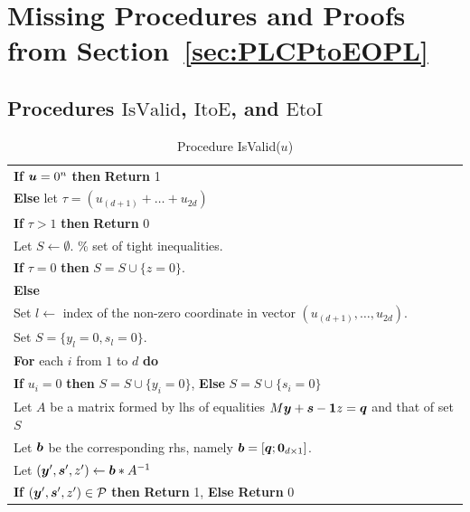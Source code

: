\documentclass[a4paper,UKenglish]{lipics2}
\theoremstyle{definition}
\def\ite{\mbox{ItoE}}
\def\eti{\mbox{EtoI}}
\def\isvalid{\mbox{IsValid}}
\newcommand{\CPol}{\mbox{${\mathcal P}$}}
\newcommand{\yy}{\mbox{\boldmath $y$}}
\newcommand{\bb}{\mbox{\boldmath $b$}}
\newcommand{\uu}{\mbox{\boldmath $u$}}
\newcommand{\qq}{\mbox{\boldmath $q$}}
\newcommand{\ones}{\mbox{\boldmath $1$}}
\newcommand{\zeros}{\mbox{\boldmath $0$}}
\newcommand{\ps}{\mbox{\boldmath $s$}}
\begin{document}
\newpage

\section{Missing Procedures and Proofs from Section~\ref{sec:PLCPtoEOPL}}\label{app:PLCPtoEOPL}
\subsection{Procedures $\isvalid$, $\ite$, and $\eti$}\label{app:proc}
\begin{table}[!hbt]
\caption{Procedure \isvalid(\uu)}\label{tab:iv}
\begin{tabular}{|l|}
\hline
\hspace{5pt} {\bf If} $\uu=0^{n}$ {\bf then} {\bf Return} 1\\
\hspace{5pt} {\bf Else} let $\tau = (u_{(d+1)}+\dots+u_{2d})$\\
\hspace{15pt} {\bf If} $\tau> 1$ {\bf then} {\bf Return} 0\\
\hspace{15pt} Let $S\leftarrow \emptyset$. \% set of tight inequalities. \\
\hspace{15pt} {\bf If} $\tau = 0$ {\bf then} $S=S\cup \{ z=0\}$. \\
\hspace{15pt} {\bf Else}\\
\hspace{30pt} Set $l\leftarrow $ index of the non-zero coordinate in vector $(u_{(d+1)},\dots,u_{2d})$. \\
\hspace{30pt} Set $S=\{y_l=0, s_l=0\}$.\\
\hspace{15pt} {\bf For} each $i$ from $1$ to $d$ {\bf do} \\
\hspace{30pt} {\bf If} $u_i=0$ {\bf then} $S=S\cup \{y_i=0\}$, {\bf Else} $S=S\cup \{s_i=0\}$\\
\hspace{15pt} Let $A$ be a matrix formed by lhs of equalities $M\yy+\ps -\ones z=\qq$ and that of set $S$\\
\hspace{15pt} Let $\bb$ be the corresponding rhs, namely $\bb=[\qq; \zeros_{d\times 1}]$.\\
\hspace{15pt} Let $(\yy',\ps',z') \leftarrow \bb * A^{-1}$\\
\hspace{15pt} {\bf If} $(\yy',\ps',z') \in \CPol$ {\bf then} {\bf Return} 1, {\bf Else} {\bf Return} 0 \\
\hline
\end{tabular}
\end{table}
\end{document}
